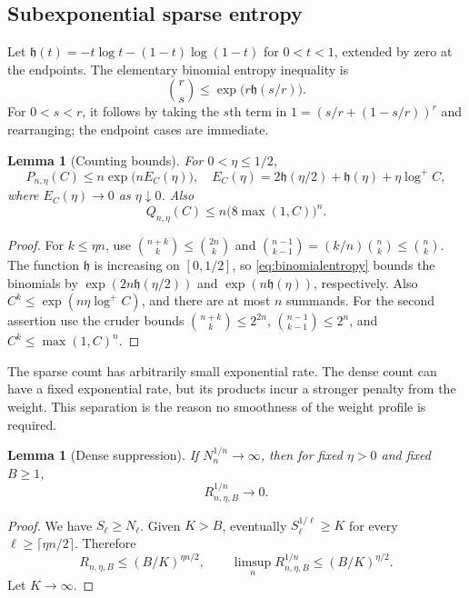 \documentclass[11pt,a4paper]{article}
\numberwithin{equation}{section}
\newtheorem{lemma}[theorem]{Lemma}
\theoremstyle{definition}
\theoremstyle{remark}
\newcommand{\lp}{\log^{+}}
\newcommand{\ent}{\mathfrak h}
\begin{document}
\subsection{Subexponential sparse entropy}

Let $\ent(t)=-t\log t-(1-t)\log(1-t)$ for $0<t<1$, extended by zero
at the endpoints. The elementary binomial entropy inequality is
\begin{equation}
 \binom{r}{s}\le\exp\bigl(r\ent(s/r)\bigr).
 \label{eq:binomialentropy}
\end{equation}
For $0<s<r$, it follows by taking the $s$th term in
$1=(s/r+(1-s/r))^r$ and rearranging; the endpoint cases are immediate.

\begin{lemma}[Counting bounds]
\label{lem:counting}
For $0<\eta\le1/2$,
\begin{equation}
 P_{n,\eta}(C)\le n\exp\bigl(n E_C(\eta)\bigr),
 \quad
 E_C(\eta)=2\ent(\eta/2)+\ent(\eta)+\eta\lp C,
 \label{eq:sparseentropy}
\end{equation}
where $E_C(\eta)\to0$ as $\eta\downarrow0$. Also
\begin{equation}
 Q_{n,\eta}(C)\le
 n\bigl(8\max(1,C)\bigr)^n.
 \label{eq:densecount}
\end{equation}
\end{lemma}
\begin{proof}
For $k\le\eta n$, use
$\binom{n+k}{k}\le\binom{2n}{k}$ and
$\binom{n-1}{k-1}=(k/n)\binom nk\le\binom nk$.
The function $\ent$ is increasing on $[0,1/2]$, so
\eqref{eq:binomialentropy} bounds the binomials by
$\exp(2n\ent(\eta/2))$ and $\exp(n\ent(\eta))$, respectively.
Also $C^k\le\exp(n\eta\lp C)$, and there are at most $n$ summands.
For the second assertion use the cruder bounds
$\binom{n+k}{k}\le2^{2n}$,
$\binom{n-1}{k-1}\le2^n$, and
$C^k\le\max(1,C)^n$.
\end{proof}

The sparse count has arbitrarily small exponential rate. The dense count
can have a fixed exponential rate, but its products incur a stronger
penalty from the weight. This separation is the reason no smoothness of
the weight profile is required.

\begin{lemma}[Dense suppression]
\label{lem:densesuppression}
If $N_n^{1/n}\to\infty$, then for fixed $\eta>0$ and fixed $B\ge1$,
\begin{equation}
 R_{n,\eta,B}^{1/n}\longrightarrow0.
 \label{eq:densesuppression}
\end{equation}
\end{lemma}
\begin{proof}
We have $S_\ell\ge N_\ell$. Given $K>B$, eventually
$S_\ell^{1/\ell}\ge K$ for every
$\ell\ge\lceil\eta n/2\rceil$. Therefore
\[
 R_{n,\eta,B}\le(B/K)^{\eta n/2},\qquad
 \limsup_nR_{n,\eta,B}^{1/n}\le(B/K)^{\eta/2}.
\]
Let $K\to\infty$.
\end{proof}
\end{document}
